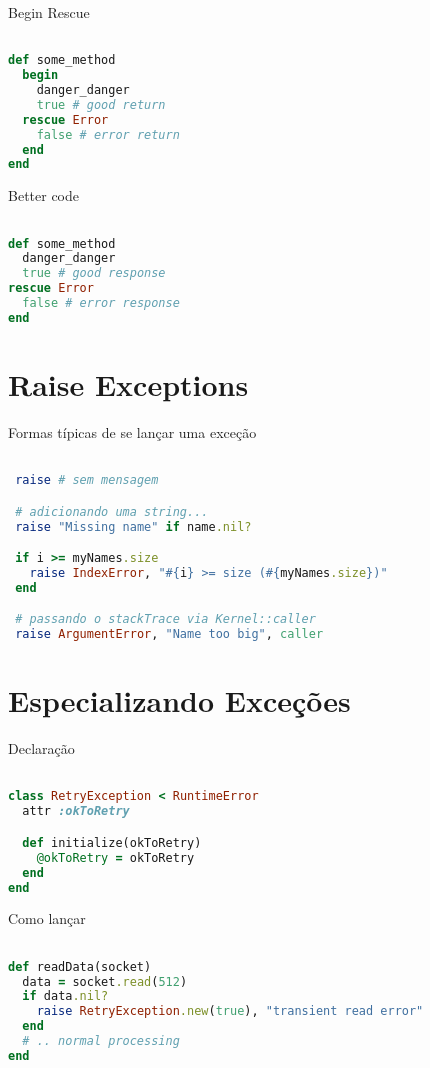 \documentclass[serif,mathserif]{book}
\begin{document}
Begin Rescue

\begin{lstlisting}[language=ruby]

def some_method
  begin
    danger_danger
    true # good return
  rescue Error
    false # error return
  end
end
\end{lstlisting}

Better code

\begin{lstlisting}[language=ruby]

def some_method
  danger_danger
  true # good response
rescue Error
  false # error response
end
\end{lstlisting}

\section{Raise Exceptions}

Formas típicas de se lançar uma exceção

\begin{lstlisting}[language=ruby]

 raise # sem mensagem

 # adicionando uma string...
 raise "Missing name" if name.nil?

 if i >= myNames.size
   raise IndexError, "#{i} >= size (#{myNames.size})"
 end

 # passando o stackTrace via Kernel::caller
 raise ArgumentError, "Name too big", caller
\end{lstlisting}

\section{Especializando Exceções}

Declaração

\begin{lstlisting}[language=ruby]

class RetryException < RuntimeError
  attr :okToRetry

  def initialize(okToRetry)
    @okToRetry = okToRetry
  end
end
\end{lstlisting}

Como lançar

\begin{lstlisting}[language=ruby]

def readData(socket)
  data = socket.read(512)
  if data.nil?
    raise RetryException.new(true), "transient read error"
  end
  # .. normal processing
end
\end{lstlisting}
\end{document}
